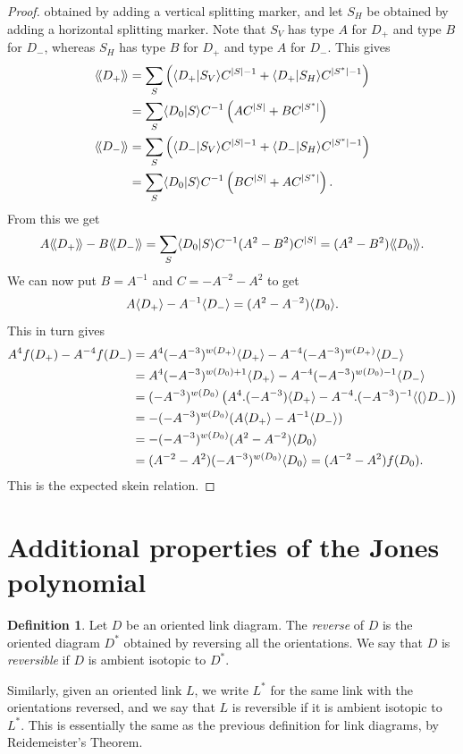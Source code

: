 \documentclass[reqno]{amsart}
\theoremstyle{definition}
\newtheorem{definition}[theorem]{Definition}
\begin{document}
\begin{proof}
 obtained by adding a vertical splitting marker, and let $S_H$ be
 obtained by adding a horizontal splitting marker.  Note that $S_V$
 has type $A$ for $D_+$ and type $B$ for $D_-$, whereas $S_H$ has type
 $B$ for $D_+$ and type $A$ for $D_-$.  This gives
 \begin{align*}
  \langle\!\langle D_+\rangle\!\rangle &= \sum_S \left(\langle D_+|S_V\rangle C^{|S|-1} + 
                           \langle D_+|S_H\rangle C^{|S^*|-1}\right) \\
           &= \sum_S \langle D_0|S\rangle C^{-1}\left(AC^{|S|} + BC^{|S^*|}\right) \\
  \langle\!\langle D_-\rangle\!\rangle &= \sum_S \left(\langle D_-|S_V\rangle C^{|S|-1} + 
                           \langle D_-|S_H\rangle C^{|S^*|-1}\right) \\
           &= \sum_S \langle D_0|S\rangle C^{-1}\left(BC^{|S|} + AC^{|S^*|}\right).
 \end{align*}
 From this we get 
 \[ A\langle\!\langle D_+\rangle\!\rangle - B\langle\!\langle D_-\rangle\!\rangle =
    \sum_S \langle D_0|S\rangle C^{-1}(A^2-B^2)C^{|S|} = (A^2-B^2)\langle\!\langle D_0\rangle\!\rangle.
 \]
 We can now put $B=A^{-1}$ and $C=-A^{-2}-A^2$ to get 
 \[ A\langle D_+\rangle - A^{-1}\langle D_-\rangle = (A^2-A^{-2}) \langle D_0\rangle. \]
 This in turn gives
 \begin{align*}
  A^4 f(D_+) - A^{-4} f(D_-) 
   &= A^4 (-A^{-3})^{w(D_+)} \langle D_+\rangle - A^{-4} (-A^{-3})^{w(D_+)} \langle D_-\rangle \\ 
   &= A^4 (-A^{-3})^{w(D_0)+1} \langle D_+\rangle - A^{-4} (-A^{-3})^{w(D_0)-1} \langle D_-\rangle \\ 
   &= (-A^{-3})^{w(D_0)}\left(
       A^4.(-A^{-3})\langle D_+\rangle - A^{-4}.(-A^{-3})^{-1}\langle (\rangle D_-)
      \right) \\
   &= -(-A^{-3})^{w(D_0)}(A\langle D_+\rangle - A^{-1}\langle D_-\rangle) \\ 
   &= -(-A^{-3})^{w(D_0)}(A^2-A^{-2})\langle D_0\rangle \\
   &= (A^{-2}-A^2)(-A^{-3})^{w(D_0)}\langle D_0\rangle = (A^{-2}-A^2)f(D_0).
 \end{align*}
 This is the expected skein relation.
\end{proof}

\section{Additional properties of the Jones polynomial}
\label{sec-jones-extra}

\begin{definition}
 Let $D$ be an oriented link diagram.  The \emph{reverse} of $D$
 is the oriented diagram $D^*$ obtained by reversing all the
 orientations.  We say that $D$ is \emph{reversible} if $D$ is ambient
 isotopic to $D^*$.

 Similarly, given an oriented link $L$, we write $L^*$ for the same
 link with the orientations reversed, and we say that $L$ is
 reversible if it is ambient isotopic to $L^*$.  This is essentially
 the same as the previous definition for link diagrams, by
 Reidemeister's Theorem. 
\end{definition}
\end{document}
